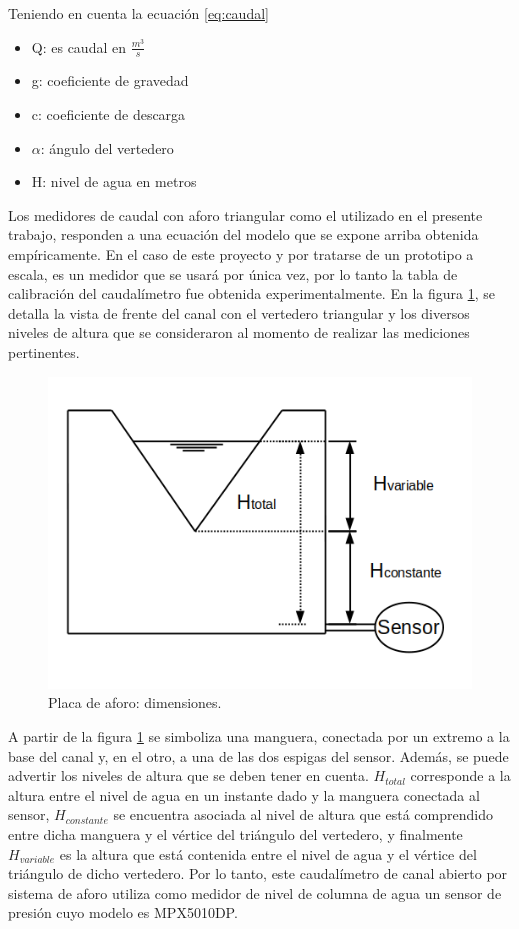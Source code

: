 Teniendo en cuenta la ecuación \ref{eq:caudal}

\begin{itemize}
\item Q: es caudal en $\frac{m^3}{s} $
\item g: coeficiente de gravedad
\item c: coeficiente de descarga
\item $\alpha$: ángulo del vertedero
\item H: nivel de agua en metros
\end{itemize}

Los medidores de caudal con aforo triangular como el utilizado en el presente trabajo, responden a una ecuación del modelo que se expone arriba obtenida empíricamente. En el caso de este proyecto y por tratarse de un prototipo a escala, es un medidor que se usará por única vez, por lo tanto la tabla de calibración del caudalímetro fue obtenida experimentalmente.  
En la figura \ref{fig:alturas vertedero}, se detalla la vista de frente del canal con el vertedero triangular y los diversos niveles de altura que se consideraron al momento de realizar las mediciones pertinentes. 

\begin{figure}[htpb]
\centering
\includegraphics[scale=.75]{./Figures/EsquemaMedicionPresion.png}
\caption{Placa de aforo: dimensiones.}
\label{fig:alturas vertedero}
\end{figure}

A partir de la figura \ref{fig:alturas vertedero} se simboliza una manguera, conectada por un extremo a la base del canal y, en el otro, a una de las dos espigas del sensor. Además, se puede advertir los niveles de altura que se deben tener en cuenta. $H_{total}$ corresponde a la altura entre el nivel de agua en un instante dado y la manguera conectada al sensor, $H_{constante}$ se encuentra asociada al nivel de altura que está comprendido entre dicha manguera y el vértice del triángulo del vertedero, y finalmente $H_{variable}$ es la altura que está contenida entre el nivel de agua y el vértice del triángulo de dicho vertedero.    
Por lo tanto, este caudalímetro de canal abierto por sistema de aforo utiliza como medidor de nivel de columna de agua un sensor de presión cuyo modelo es MPX5010DP. 

